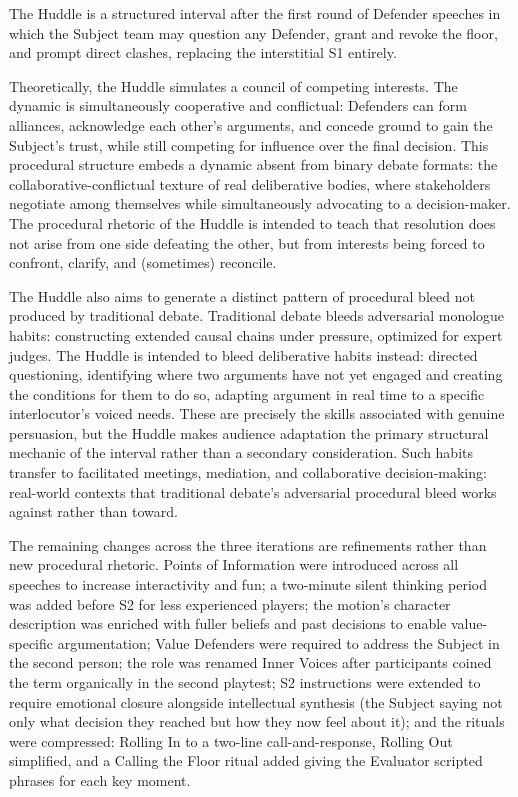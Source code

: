 The Huddle is a structured interval after the first round of Defender speeches in which the Subject team may question any Defender, grant and revoke the floor, and prompt direct clashes, replacing the interstitial S1 entirely.

Theoretically, the Huddle simulates a council of competing interests. The dynamic is simultaneously cooperative and conflictual: Defenders can form alliances, acknowledge each other's arguments, and concede ground to gain the Subject's trust, while still competing for influence over the final decision. This procedural structure embeds a dynamic absent from binary debate formats: the collaborative-conflictual texture of real deliberative bodies, where stakeholders negotiate among themselves while simultaneously advocating to a decision-maker. The procedural rhetoric of the Huddle is intended to teach that resolution does not arise from one side defeating the other, but from interests being forced to confront, clarify, and (sometimes) reconcile.

The Huddle also aims to generate a distinct pattern of procedural bleed \parencite{hugaas2024bleed} not produced by traditional debate. Traditional debate bleeds adversarial monologue habits: constructing extended causal chains under pressure, optimized for expert judges. The Huddle is intended to bleed deliberative habits instead: directed questioning, identifying where two arguments have not yet engaged and creating the conditions for them to do so, adapting argument in real time to a specific interlocutor's voiced needs. These are precisely the skills \textcite{cirlin1997sociological} associated with genuine persuasion, but the Huddle makes audience adaptation the primary structural mechanic of the interval rather than a secondary consideration. Such habits transfer to facilitated meetings, mediation, and collaborative decision-making: real-world contexts that traditional debate's adversarial procedural bleed works against rather than toward.

The remaining changes across the three iterations are refinements rather than new procedural rhetoric. Points of Information were introduced across all speeches to increase interactivity and fun; a two-minute silent thinking period was added before S2 for less experienced players; the motion's character description was enriched with fuller beliefs and past decisions to enable value-specific argumentation; Value Defenders were required to address the Subject in the second person; the role was renamed Inner Voices after participants coined the term organically in the second playtest; S2 instructions were extended to require emotional closure alongside intellectual synthesis (the Subject saying not only what decision they reached but how they now feel about it); and the rituals were compressed: Rolling In to a two-line call-and-response, Rolling Out simplified, and a Calling the Floor ritual added giving the Evaluator scripted phrases for each key moment.

